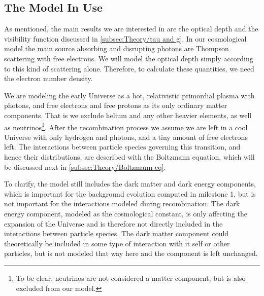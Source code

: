\documentclass[10pt,a4paper]{article}
\begin{document}
\subsection{The Model In Use}
\label{subsec:Theory/Model}
As mentioned, the main results we are interested in are the optical depth and the visibility function discussed in \cref{subsec:Theory/tau and g}. In our cosmological model the main source absorbing and disrupting photons are Thompson scattering with free electrons. We will model the optical depth simply according to this kind of scattering alone. Therefore, to calculate these quantities, we need the electron number density.

We are modeling the early Universe as a hot, relativistic primordial plasma with photons, and free electrons and free protons as its only ordinary matter components. That is we exclude helium and any other heavier elements, as well as neutrinos\footnote{To be clear, neutrinos are not  considered a matter component, but is also excluded from our model.}.
After the recombination process we assume we are left in a cool Universe with only hydrogen and photons, and a tiny amount of free electrons left. The interactions between particle species governing this transition, and hence their distributions, are described with the Boltzmann equation, which will be discussed next in \cref{subsec:Theory/Boltzmann eq}.

To clarify, the model still includes the dark matter and dark energy components, which is important for the background evolution computed in milestone 1, but is not important for the interactions modeled during recombination. The dark energy component, modeled as the cosmological constant, is only affecting the expansion of the Universe and is therefore not directly included in the interactions between particle species. The dark matter component could theoretically be included in some type of interaction with it self or other particles, but is not modeled that way here and the component is left unchanged.

\end{document}

